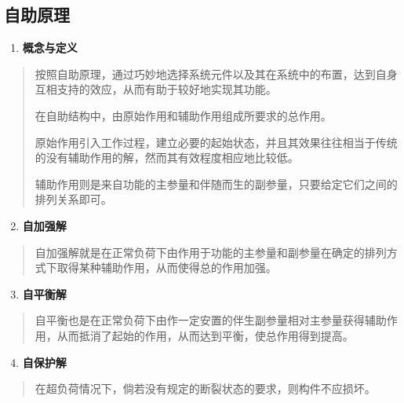 \documentclass[letterpaper,10pt,english]{sphinxmanual}
\begin{document}
\subsection{自助原理}
\label{unit6:id11}\begin{enumerate}
\item {} 
\textbf{概念与定义}

\end{enumerate}
\begin{quote}

按照自助原理，通过巧妙地选择系统元件以及其在系统中的布置，达到自身互相支持的效应，从而有助于较好地实现其功能。

在自助结构中，由原始作用和辅助作用组成所要求的总作用。

原始作用引入工作过程，建立必要的起始状态，并且其效果往往相当于传统的没有辅助作用的解，然而其有效程度相应地比较低。

辅助作用则是来自功能的主参量和伴随而生的副参量，只要给定它们之间的排列关系即可。
\end{quote}
\begin{enumerate}
\setcounter{enumi}{1}
\item {} 
\textbf{自加强解}

\end{enumerate}
\begin{quote}

自加强解就是在正常负荷下由作用于功能的主参量和副参量在确定的排列方式下取得某种辅助作用，从而使得总的作用加强。
\end{quote}
\begin{enumerate}
\setcounter{enumi}{2}
\item {} 
\textbf{自平衡解}

\end{enumerate}
\begin{quote}

自平衡也是在正常负荷下由作一定安置的伴生副参量相对主参量获得辅助作用，从而抵消了起始的作用，从而达到平衡，使总作用得到提高。
\end{quote}
\begin{enumerate}
\setcounter{enumi}{3}
\item {} 
\textbf{自保护解}

\end{enumerate}
\begin{quote}

在超负荷情况下，倘若没有规定的断裂状态的要求，则构件不应损坏。
\end{quote}
\end{document}
